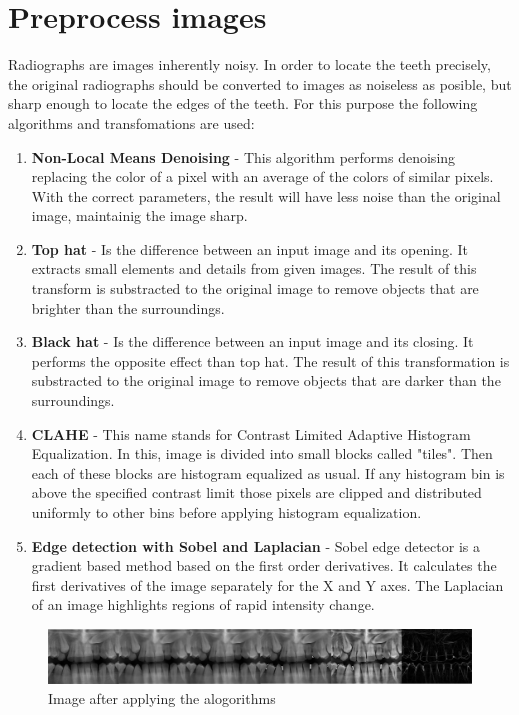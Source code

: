 \section{Preprocess images}

Radiographs are images inherently noisy. In order to locate
the teeth precisely, the original radiographs should be
converted to images as noiseless as posible, but sharp
enough to locate the edges of the teeth. For this purpose
the following algorithms and transfomations are used:

\begin{enumerate}
  \item \textbf{Non-Local Means Denoising} - This algorithm
  performs denoising replacing the color of a pixel with
  an average of the colors of similar pixels. With the correct
  parameters, the result will have less noise than the original
  image, maintainig the image sharp.
\item \textbf{Top hat} - Is the difference between an input
  image and its opening. It extracts small elements and details
  from given images. The result of this transform is substracted
  to the original image to remove objects that are brighter than
  the surroundings.
\item \textbf{Black hat} - Is the difference between an input
  image and its closing. It performs the opposite effect than
  top hat. The result of this transformation is substracted to
  the original image to remove objects that are darker than the
  surroundings.
\item \textbf{CLAHE} - This name stands for Contrast Limited
  Adaptive Histogram Equalization. In this, image is divided
  into small blocks called "tiles". Then each of these blocks
  are histogram equalized as usual. If any histogram bin is
  above the specified contrast limit those pixels are clipped
  and distributed uniformly to other bins before applying
  histogram equalization.
\item \textbf{Edge detection with Sobel and Laplacian} - Sobel
  edge detector is a gradient based method based on the first
  order derivatives. It calculates the first derivatives of
  the image separately for the X and Y axes. The Laplacian of
  an image highlights regions of rapid intensity change.
\end{enumerate}

\begin{figure}[h]
  \centering
  \includegraphics[width=\linewidth]{img/enhancenment}
  \caption{Image after applying the alogorithms}
  \end{figure}
